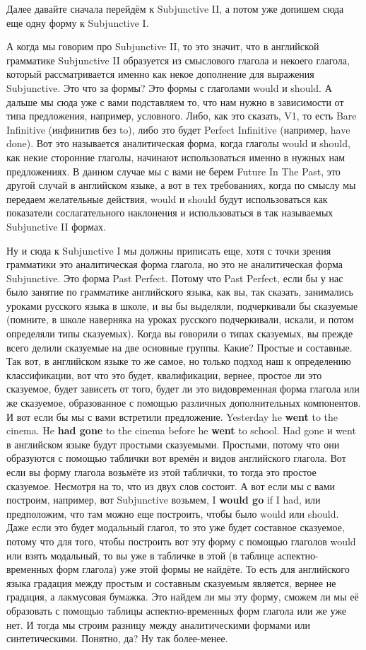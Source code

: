 \documentclass[main.tex]{subfiles}
\begin{document}
Далее давайте сначала перейдём к Subjunctive II, а потом уже допишем сюда еще одну форму к Subjunctive I.

А когда мы говорим про Subjunctive II, то это значит, что в английской грамматике Subjunctive II образуется из смыслового глагола и некоего глагола, который рассматривается именно как некое дополнение для выражения Subjunctive.
Это что за формы?
Это формы с глаголами would и should.
А дальше мы сюда уже с вами подставляем то, что нам нужно в зависимости от типа предложения, например, условного.
Либо, как это сказать, V1, то есть Bare Infinitive (инфинитив без to), либо это будет Perfect Infinitive (например, have done).
Вот это называется аналитическая форма, когда глаголы would и should, как некие сторонние глаголы, начинают использоваться именно в нужных нам предложениях.
В данном случае мы с вами не берем Future In The Past, это другой случай в английском языке, а вот в тех требованиях, когда по смыслу мы передаем желательные действия, would и should будут использоваться как показатели сослагательного наклонения и использоваться в так называемых Subjunctive II формах.

Ну и сюда к Subjunctive I мы должны приписать еще, хотя с точки зрения грамматики это аналитическая форма глагола, но это не аналитическая форма Subjunctive.
Это форма Past Perfect.
Потому что Past Perfect, если бы у нас было занятие по грамматике английского языка, как вы, так сказать, занимались уроками русского языка в школе, и вы бы выделяли, подчеркивали бы сказуемые (помните, в школе наверняка на уроках русского подчеркивали, искали, и потом определяли типы сказуемых).
Когда вы говорили о типах сказуемых, вы прежде всего делили сказуемые на две основные группы.
Какие?
Простые и составные.
Так вот, в английском языке то же самое, но только подход наш к определению классификации, вот что это будет, квалификации, вернее, простое ли это сказуемое, будет зависеть от того, будет ли это видовременная форма глагола или же сказуемое, образованное с помощью различных дополнительных компонентов.
И вот если бы мы с вами встретили предложение.
Yesterday he \textbf{went} to the cinema.
He \textbf{had gone} to the cinema before he \textbf{went} to school.
Had gone и went в английском языке будут простыми сказуемыми.
Простыми, потому что они образуются с помощью таблички вот времён и видов английского глагола.
Вот если вы форму глагола возьмёте из этой таблички, то тогда это простое сказуемое.
Несмотря на то, что из двух слов состоит.
А вот если мы с вами построим, например, вот Subjunctive возьмем, I \textbf{would go} if I had, или предположим, что там можно еще построить, чтобы было would или should.
Даже если это будет модальный глагол, то это уже будет составное сказуемое, потому что для того, чтобы построить вот эту форму с помощью глаголов would или взять модальный, то вы уже в табличке в этой (в таблице аспектно-временных форм глагола) уже этой формы не найдёте.
То есть для английского языка градация между простым и составным сказуемым является, вернее не градация, а лакмусовая бумажка.
Это найдем ли мы эту форму, сможем ли мы её образовать с помощью таблицы аспектно-временных форм глагола или же уже нет.
И тогда мы строим разницу между аналитическими формами или синтетическими.
Понятно, да?
Ну так более-менее.
\end{document}
